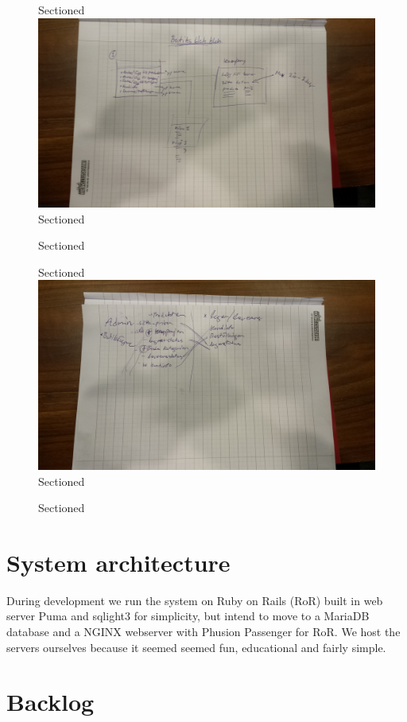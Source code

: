 \documentclass[paper=a4, fontsize=11pt]{report} %
\begin{document}
\begin{itemize}
		\begin{figure}
		Sectioned\includegraphics[scale=0.12]{artifacts/ButiksAdmin.jpeg}
		Sectioned\caption{}
		Sectioned\label{fig:3}
		\end{figure}

		\begin{figure}
		Sectioned\includegraphics[scale=0.12]{artifacts/Admin.jpeg}
		Sectioned\caption{}
		Sectioned\label{fig:4}
		\end{figure}

		\section*{System architecture}
		During development we run the system on Ruby on Rails (RoR) built in web server
		Puma and sqlight3 for simplicity, but intend to move to a MariaDB database
		and a NGINX webserver with Phusion Passenger for RoR. We host
		the servers ourselves because it seemed seemed fun, educational and fairly simple.

		\section*{Backlog}


\end{itemize}
\end{document}
